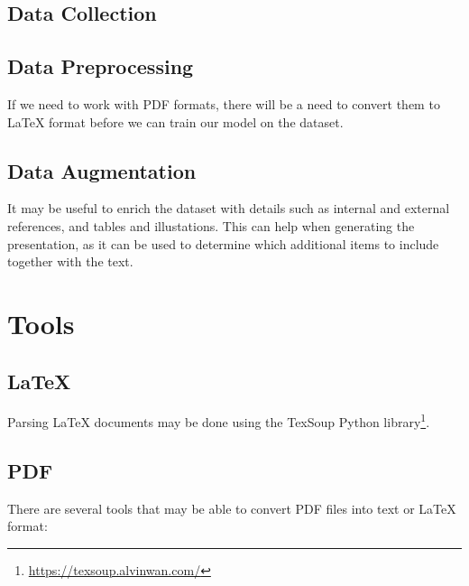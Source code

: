 \subsection{Data Collection}

\subsection{Data Preprocessing}
If we need to work with PDF formats, there will be a need to convert them to \LaTeX{} format before we can train our model on the dataset. 

\subsection{Data Augmentation}
It may be useful to enrich the dataset with details such as internal and external references, and tables and illustations. This can help when generating the presentation, as it can be used to determine which additional items to include together with the text.

\section{Tools}

\subsection{\LaTeX{}}
Parsing \LaTeX{} documents may be done using the TexSoup Python library\footnote{\url{https://texsoup.alvinwan.com/}}.

\subsection{PDF}
There are several tools that may be able to convert PDF files into text or \LaTeX{} format: 

